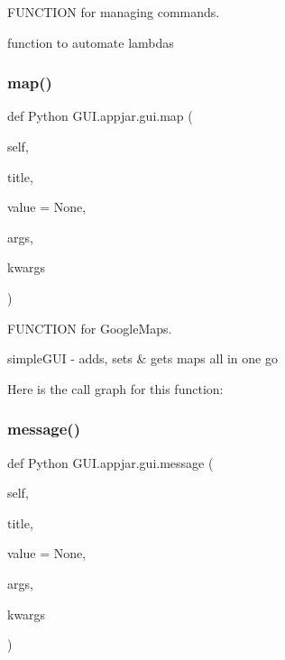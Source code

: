 \begin{DoxyVerb}
F\+U\+N\+C\+T\+I\+ON for managing commands. 

\begin{DoxyVerb}function to automate lambdas \end{DoxyVerb}
 \mbox{\label{class_python_01_g_u_i_1_1appjar_1_1gui_ae1ab2247d06958d044ab81677644d57e}} 
\subsubsection{\texorpdfstring{map()}{map()}}
{\footnotesize\ttfamily def Python G\+U\+I.\+appjar.\+gui.\+map (\begin{DoxyParamCaption}\item[{}]{self,  }\item[{}]{title,  }\item[{}]{value = {\ttfamily None},  }\item[{}]{args,  }\item[{}]{kwargs }\end{DoxyParamCaption})}



F\+U\+N\+C\+T\+I\+ON for Google\+Maps. 

\begin{DoxyVerb}simpleGUI - adds, sets & gets maps all in one go \end{DoxyVerb}
 Here is the call graph for this function\+:
\mbox{\label{class_python_01_g_u_i_1_1appjar_1_1gui_a272e00ba02f4665ddbcc731f83191afd}} 
\subsubsection{\texorpdfstring{message()}{message()}}
{\footnotesize\ttfamily def Python G\+U\+I.\+appjar.\+gui.\+message (\begin{DoxyParamCaption}\item[{}]{self,  }\item[{}]{title,  }\item[{}]{value = {\ttfamily None},  }\item[{}]{args,  }\item[{}]{kwargs }\end{DoxyParamCaption})}




\end{DoxyVerb}
